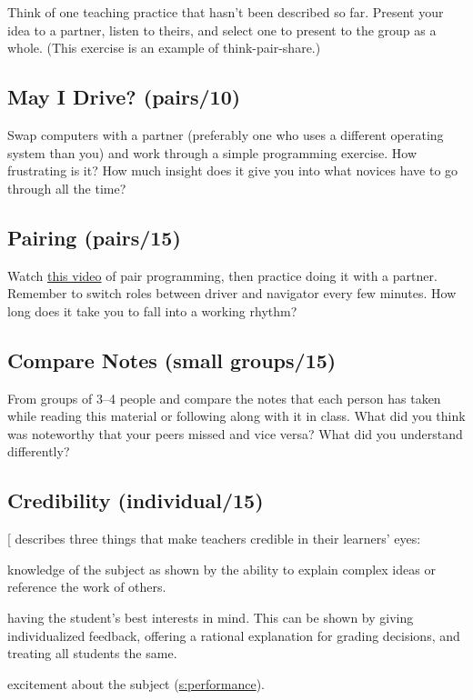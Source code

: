 Think of one teaching practice that hasn't been described so far.
Present your idea to a partner, listen to theirs, and select one to
present to the group as a whole. (This exercise is an example of
think-pair-share.)

\subsection{May I Drive? (pairs/10)}\label{may-i-drive-pairs10}

Swap computers with a partner (preferably one who uses a different
operating system than you) and work through a simple programming
exercise. How frustrating is it? How much insight does it give you into
what novices have to go through all the time?

\subsection{Pairing (pairs/15)}\label{pairing-pairs15}

Watch \href{https://www.youtube.com/watch?v=vgkahOzFH2Q}{this video} of pair programming, then
practice doing it with a partner. Remember to switch roles between
driver and navigator every few minutes. How long does it take you to
fall into a working rhythm?

\subsection{Compare Notes (small groups/15)}\label{compare-notes-small-groups15}

From groups of 3--4 people and compare the notes that each person has
taken while reading this material or following along with it in class.
What did you think was noteworthy that your peers missed and vice versa?
What did you understand differently?

\subsection{Credibility (individual/15)}\label{credibility-individual15}

{[}\protect[\hyperlink{b:Fink2013}{Fink2013}]{]} describes three things that make teachers credible in
their learners' eyes:

\begin{description}
\tightlist
\item[Competence:]
knowledge of the subject as shown by the ability to explain complex
ideas or reference the work of others.
\item[Trustworthiness:]
having the student's best interests in mind. This can be shown by
giving individualized feedback, offering a rational explanation for
grading decisions, and treating all students the same.
\item[Dynamism:]
excitement about the subject (\protect\hyperlink{CHAPTER}{s:performance}).
\end{description}

